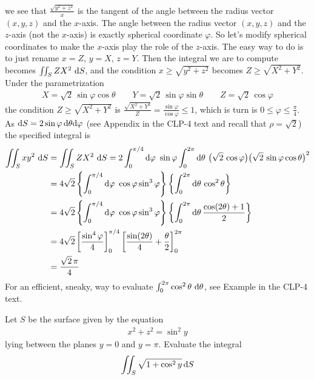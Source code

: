 \begin{solution}
{}
we see that $\frac{\sqrt{y^2 + z^2}}{x}$ is the tangent of the
angle between the radius vector $(x,y,z)$ and the $x$-axis. The 
angle between the radius vector $(x,y,z)$ and the $z$-axis (not the $x$-axis)
is exactly spherical coordinate $\varphi$. So let's modify spherical
coordinates to make the $x$-axis play the role of the $z$-axis. 
The easy way to do is to just rename $x=Z$, $y=X$, $z=Y$. Then the integral
we are to compute becomes $\iint_S ZX^2\ \mathrm{d}S$, and the
condition $x \ge \sqrt{y^2 + z^2}$ becomes $Z \ge \sqrt{X^2 + Y^2}$.
Under the parametrization 
\begin{align*}
X=\sqrt{2}\,\sin\varphi\cos\theta \qquad
Y=\sqrt{2}\,\sin\varphi\sin\theta \qquad
Z=\sqrt{2}\,\cos\varphi
\end{align*}
the condition $Z \ge \sqrt{X^2 + Y^2}$ is
$\frac{\sqrt{X^2 + Y^2}}{Z}=\frac{\sin\varphi}{\cos\varphi}\le 1$,
which is turn is $0\le\varphi\le\frac{\pi}{4}$. As
$\mathrm{d}S=2\sin\varphi\,\mathrm{d}\theta\mathrm{d}\varphi$ 
(see Appendix  in the CLP-4 text and recall that $\rho=\sqrt{2}$) the specified integral
is
\begin{align*}
\dblInt_S xy^2\ \dee{S}
&=\dblInt_S ZX^2\ \dee{S}
=2\int_0^{\pi/4}\dee{\varphi}\ \sin\varphi \int_0^{2\pi}\dee{\theta}\ 
\big(\sqrt{2}\,\cos\varphi\big)\big(\sqrt{2}\,\sin\varphi\cos\theta\big)^2
\\
&=4\sqrt{2} \left\{\int_0^{\pi/4}\dee{\varphi}\ \cos\varphi\sin^3\varphi\right\}
            \left\{\int_0^{2\pi}\dee{\theta}\, \cos^2\theta\right\} \\
&=4\sqrt{2} \left\{\int_0^{\pi/4}\dee{\varphi}\ \cos\varphi\sin^3\varphi\right\}
           \left\{\int_0^{2\pi}\dee{\theta}\,\frac{\cos(2\theta)+1}{2}\right\} \\
&=4\sqrt{2} \left[\frac{\sin^4\varphi}{4}\right]_0^{\pi/4} 
     \left[\frac{\sin(2\theta)}{4}+\frac{\theta}{2}\right]_0^{2\pi} \\
&= \frac{\sqrt{2}\,\pi}{4}
\end{align*}
For an efficient, sneaky, way to evaluate 
$\int_0^{2\pi} \cos^2 \theta\ \mathrm{d}\theta$, see Example
 in the CLP-4 text.
\end{solution}

\begin{question}[M317 2006D, 2012J] %
Let $S$ be the surface given by the equation
\begin{align*}
x^2 + z^2 = \sin^2y
\end{align*}
lying between the planes $y = 0$ and $y = \pi$. Evaluate the integral
\begin{align*}
\iint_S\sqrt{1 + \cos^2y}\, \mathrm{d}S
\end{align*}
\end{question}

